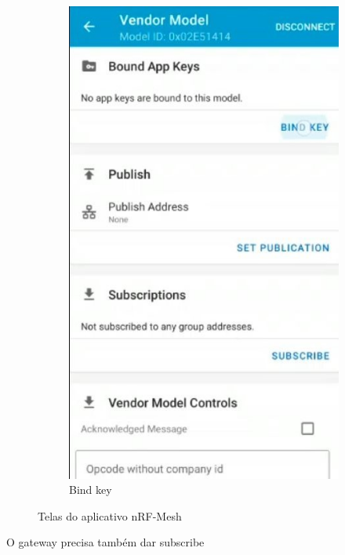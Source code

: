 \documentclass[../monografia.tex]{subfiles}
\begin{document}
\begin{figure}[h]
\begin{subfigure}[b]{0.22\textwidth}
		\includegraphics[width=\textwidth]{mesh-bind-4}
		\caption{Bind key}
		\label{fig:mesh-bind-4}
	\end{subfigure}
	\caption{Telas do aplicativo nRF-Mesh}
	\label{fig:app-nrf-mesh}
\end{figure}

O gateway precisa também dar subscribe %
\end{document}
